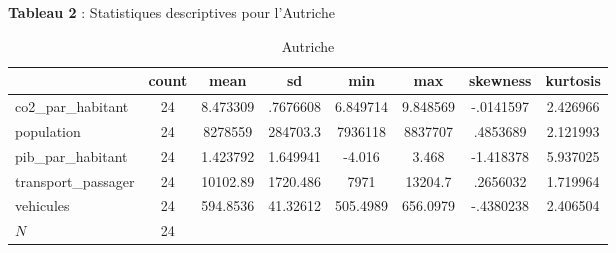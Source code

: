 
\textbf{Tableau 2} : Statistiques descriptives pour l'Autriche


\begin{table}[H]
    \centering
\def\sym#1{\ifmmode^{#1}\else\(^{#1}\)\fi}
    \footnotesize{
\begin{tabular}{|l*{1}{|ccccccc|}}
\hline
            &       count&        mean&          sd&         min&         max&    skewness&    kurtosis\\
\hline
co2\_par\_habitant&          24&    8.473309&    .7676608&    6.849714&    9.848569&   -.0141597&    2.426966\\
population  &          24&     8278559&    284703.3&     7936118&     8837707&    .4853689&    2.121993\\
pib\_par\_habitant&          24&    1.423792&    1.649941&      -4.016&       3.468&   -1.418378&    5.937025\\
transport\_passager&          24&    10102.89&    1720.486&        7971&     13204.7&    .2656032&    1.719964\\
vehicules   &          24&    594.8536&    41.32612&    505.4989&    656.0979&   -.4380238&    2.406504\\
\hline
\(N\)       &          24&            &            &            &            &            &            \\
\hline
\end{tabular}
}
    \caption{Autriche}
    \label{tab:Autriche}
\end{table}


\vspace*{0.5cm}

